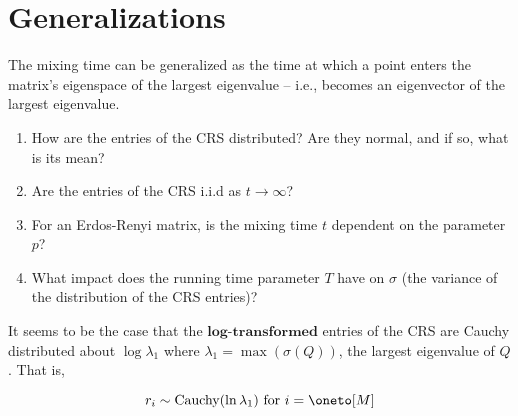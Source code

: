 \section{Generalizations}

The mixing time can be generalized as the time at which a point enters the matrix's eigenspace of the largest eigenvalue -- i.e., becomes an eigenvector of the largest eigenvalue.


%
%

\newpage



\begin{enumerate}
  \item How are the entries of the CRS distributed? Are they normal, and if so, what is its mean?
  \item Are the entries of the CRS i.i.d as $t \to \infty$?
  \item For an Erdos-Renyi matrix, is the mixing time $t$ dependent on the parameter $p$?
  \item What impact does the running time parameter $T$ have on $\sigma$ (the variance of the distribution of the CRS entries)?
\end{enumerate}


It seems to be the case that the $\textbf{log-transformed}$ entries of the CRS are Cauchy distributed about $\log{\lambda_1}$ where $\lambda_1 = \max(\sigma(Q))$, the largest eigenvalue of $Q$. That is,

$$r_i \sim \text{Cauchy}(\ln\lambda_1) \text{ for } i = \oneto[M]$$
